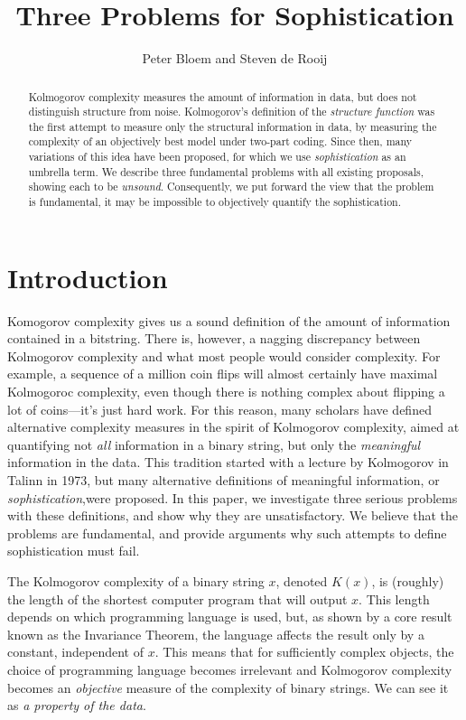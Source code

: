 \documentclass{style/llncs}
\title{Three Problems for Sophistication}
\author{Peter Bloem and Steven de Rooij}
\institute{
  System and Network Engineering Group, \\University of Amsterdam, the Netherlands\\
  \email{uva@peterbloem.nl, steven.de.rooij@gmail.com}
}
\begin{document}
\maketitle

\begin{abstract}
Kolmogorov complexity measures the amount of information in data, but does not distinguish structure from noise. Kolmogorov's definition of the \emph{structure function} was the first attempt to measure only the structural information in data, by measuring the complexity of an objectively best model under two-part coding. Since then, many variations of this idea have been proposed, for which we use \emph{sophistication} as an umbrella term. We describe three fundamental problems with all existing proposals, showing each  to be \emph{unsound}. Consequently, we put forward the view that the problem is fundamental, it may be impossible to objectively quantify the sophistication.
\end{abstract}

\section{Introduction}
Komogorov complexity gives us a sound definition of the amount of information contained in a bitstring. There is, however, a nagging discrepancy between Kolmogorov complexity and what most people would consider complexity. For example, a sequence of a million coin flips will almost certainly have maximal Kolmogoroc complexity, even though there is nothing complex about flipping a lot of coins---it's just hard work. For this reason, many scholars have defined alternative complexity measures in the spirit of Kolmogorov complexity, aimed at quantifying not \emph{all} information in a binary string, but only the \emph{meaningful} information in the data. This tradition started with a lecture by Kolmogorov in Talinn in 1973, but many alternative definitions of meaningful information, or \emph{sophistication},\footnotemark were proposed. In this paper, we investigate three serious problems with these definitions, and show why they are unsatisfactory. We believe that the problems are fundamental, and provide arguments why such attempts to define sophistication must fail.

The Kolmogorov complexity of a binary string $x$, denoted $K(x)$, is (roughly) the length of the shortest computer program that will output $x$. This length depends on which programming language is used, but, as shown by a core result known as the Invariance Theorem, the language affects the result only by a constant, independent of $x$. This means that for sufficiently complex objects, the choice of programming language becomes irrelevant and Kolmogorov complexity becomes an \emph{objective} measure of the complexity of binary strings. We can see it as \emph{a property of the data}.
\end{document}
